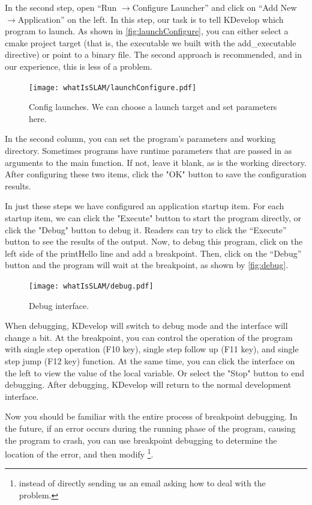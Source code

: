 In the second step, open ``Run $\rightarrow$Configure Launcher'' and click on ``Add New$\rightarrow$Application'' on the left. In this step, our task is to tell KDevelop which program to launch. As shown in \autoref{fig:launchConfigure}, you can either select a cmake project target (that is, the executable we built with the add\_executable directive) or point to a binary file. The second approach is recommended, and in our experience, this is less of a problem.

\begin{figure}[!ht]
    \centering
    \texttt{[image: whatIsSLAM/launchConfigure.pdf]}
    \caption{Config launches. We can choose a launch target and set parameters here. }
    \label{fig:launchConfigure}
\end{figure}

In the second column, you can set the program's parameters and working directory. Sometimes programs have runtime parameters that are passed in as arguments to the main function. If not, leave it blank, as is the working directory. After configuring these two items, click the "OK" button to save the configuration results.

In just these steps we have configured an application startup item. For each startup item, we can click the "Execute" button to start the program directly, or click the "Debug" button to debug it. Readers can try to click the ``Execute'' button to see the results of the output. Now, to debug this program, click on the left side of the printHello line and add a breakpoint. Then, click on the ``Debug'' button and the program will wait at the breakpoint, as shown by \autoref{fig:debug}.

\begin{figure}[!htp]
    \centering
    \texttt{[image: whatIsSLAM/debug.pdf]}
    \caption{Debug interface. }
    \label{fig:debug}
\end{figure}

When debugging, KDevelop will switch to debug mode and the interface will change a bit. At the breakpoint, you can control the operation of the program with single step operation (F10 key), single step follow up (F11 key), and single step jump (F12 key) function. At the same time, you can click the interface on the left to view the value of the local variable. Or select the "Stop" button to end debugging. After debugging, KDevelop will return to the normal development interface.

Now you should be familiar with the entire process of breakpoint debugging. In the future, if an error occurs during the running phase of the program, causing the program to crash, you can use breakpoint debugging to determine the location of the error, and then modify \footnote{ instead of directly sending us an email asking how to deal with the problem. }.

